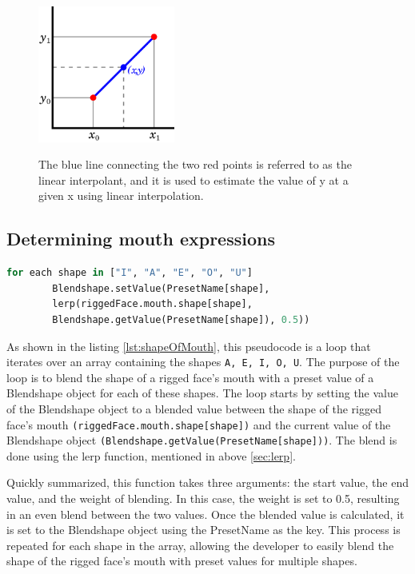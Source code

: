 \begin{figure}[htb]
  \centering
  \includegraphics[width=0.4\textwidth]{pics/lerp.png}
  \caption{The blue line connecting the two red points is referred to as the linear interpolant, and it is used to estimate the value of y at a given x using linear interpolation.}
  \cite{angles}
  \label{fig:lerp}
\end{figure}

\subsection{Determining mouth expressions}

\begin{lstlisting}[language=Python,caption=Shape of mouth,label=lst:shapeOfMouth]
    for each shape in ["I", "A", "E", "O", "U"]
        Blendshape.setValue(PresetName[shape], 
        lerp(riggedFace.mouth.shape[shape], 
        Blendshape.getValue(PresetName[shape]), 0.5))

\end{lstlisting}
As shown in the listing \ref{lst:shapeOfMouth}, this pseudocode is a loop that iterates over an array containing the shapes \texttt{A, E, I, O, U}. 
The purpose of the loop is to blend the shape of a rigged face's mouth with a preset value of a 
Blendshape object for each of these shapes. The loop starts by setting the value of the Blendshape 
object to a blended value between the shape of the rigged face's mouth \texttt{(riggedFace.mouth.shape[shape])}
and the current value of the Blendshape object \texttt{(Blendshape.getValue(PresetName[shape]))}. 
The blend is done using the lerp function, mentioned in above \ref{sec:lerp}.

Quickly summarized, this function takes three arguments: the start value, the end value, and the weight of blending. 
In this case, the weight is set to 0.5, resulting in an even blend between the two values.
Once the blended value is calculated, it is set to the Blendshape object using the PresetName 
as the key. This process is repeated for each shape in the array, allowing the developer to 
easily blend the shape of the rigged face's mouth with preset values for multiple shapes.

